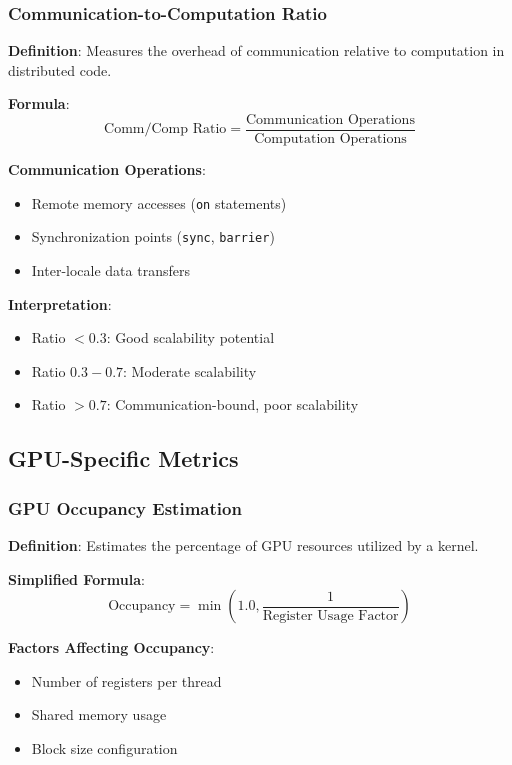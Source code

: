 \documentclass[11pt,a4paper]{article}
\begin{document}
\subsubsection{Communication-to-Computation Ratio}

\textbf{Definition}: Measures the overhead of communication relative to computation in distributed code.

\textbf{Formula}:
\begin{equation}
\text{Comm/Comp Ratio} = \frac{\text{Communication Operations}}{\text{Computation Operations}}
\end{equation}

\textbf{Communication Operations}:
\begin{itemize}
    \item Remote memory accesses (\texttt{on} statements)
    \item Synchronization points (\texttt{sync}, \texttt{barrier})
    \item Inter-locale data transfers
\end{itemize}

\textbf{Interpretation}:
\begin{itemize}
    \item Ratio $< 0.3$: Good scalability potential
    \item Ratio $0.3 - 0.7$: Moderate scalability
    \item Ratio $> 0.7$: Communication-bound, poor scalability
\end{itemize}

\subsection{GPU-Specific Metrics}

\subsubsection{GPU Occupancy Estimation}

\textbf{Definition}: Estimates the percentage of GPU resources utilized by a kernel.

\textbf{Simplified Formula}:
\begin{equation}
\text{Occupancy} = \min\left(1.0, \frac{1}{\text{Register Usage Factor}}\right)
\end{equation}

\textbf{Factors Affecting Occupancy}:
\begin{itemize}
    \item Number of registers per thread
    \item Shared memory usage
    \item Block size configuration
\end{itemize}
\end{document}
